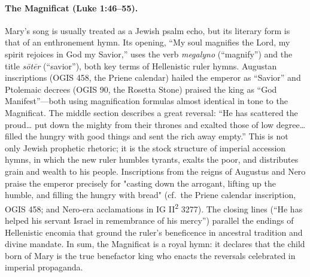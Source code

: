 \paragraph{The Magnificat (Luke 1:46--55).}
Mary’s song is usually treated as a Jewish psalm echo, but its literary form is that of an enthronement hymn.
Its opening, “My soul magnifies the Lord, my spirit rejoices in God my Savior,” uses the verb \emph{megalyno} (“magnify”) and the title \emph{sōtēr} (“savior”), both key terms of Hellenistic ruler hymns.
Augustan inscriptions (OGIS 458, the Priene calendar) hailed the emperor as ``Savior'' and Ptolemaic decrees (OGIS 90, the Rosetta Stone) praised the king as ``God Manifest''---both using magnification formulas almost identical in tone to the Magnificat.
The middle section describes a great reversal: “He has scattered the proud… put down the mighty from their thrones and exalted those of low degree… filled the hungry with good things and sent the rich away empty.”
This is not only Jewish prophetic rhetoric; it is the stock structure of imperial accession hymns, in which the new ruler humbles tyrants, exalts the poor, and distributes grain and wealth to his people.
Inscriptions from the reigns of Augustus and Nero praise the emperor precisely for "casting down the arrogant, lifting up the humble, and filling the hungry with bread" (cf.~the Priene calendar inscription, OGIS 458; and Nero-era acclamations in IG II\textsuperscript{2} 3277).
The closing lines (“He has helped his servant Israel in remembrance of his mercy”) parallel the endings of Hellenistic encomia that ground the ruler’s beneficence in ancestral tradition and divine mandate.
In sum, the Magnificat is a royal hymn: it declares that the child born of Mary is the true benefactor king who enacts the reversals celebrated in imperial propaganda.

